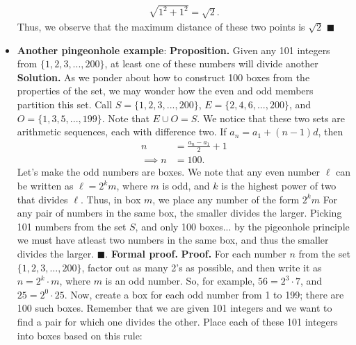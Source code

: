 \documentclass{report}
\begin{document}
\begin{itemize}
            \begin{align*}
                \sqrt{1^{2} + 1^{2}} = \sqrt{2}
            .\end{align*}
            Thus, we observe that the maximum distance of these two points is $\sqrt{2}$ $\blacksquare$
        \item \textbf{Another pingeonhole example}:
            \bigbreak \noindent 
            \textbf{Proposition.} Given any 101 integers from $\{1, 2, 3, . . . , 200\}$, at least one of these numbers will divide another
            \bigbreak \noindent 
            \textbf{Solution.} As we ponder about how to construct 100 boxes from the properties of the set, we may wonder how the even and odd members partition this set. Call $S = \{1,2,3,...,200\} $, $E=\{2,4,6,...,200\} $, and $O = \{1,3,5,...,199\} $. Note that $E \cup O = S$. We notice that these two sets are arithmetic sequences, each with difference two. If $a_{n} = a_{1} +  (n-1)d$, then 
            \begin{align*}
                n &= \frac{a_{n} - a_{1}}{2} + 1 \\
                \implies n&= 100
            .\end{align*}
            \bigbreak \noindent 
            Let's make the odd numbers are boxes. We note that any even number $\ell$ can be written as $\ell = 2^{k}m$, where $m$ is odd, and $k$ is the highest power of two that divides $\ell$. Thus, in box $m$, we place any number of the form $2^{k}m$
            \bigbreak \noindent 
            \bigbreak \noindent 
            For any pair of numbers in the same box, the smaller divides the larger. Picking 101 numbers from the set $S$, and only 100 boxes... by the pigeonhole principle we must have atleast two numbers in the same box, and thus the smaller divides the larger. $\blacksquare$.
            \bigbreak \noindent 
            \textbf{Formal proof.} 
            \textbf{Proof.} For each number $n$ from the set $\{1, 2, 3, \dots, 200\}$, factor out as many 2's as possible, and then write it as $n = 2^k \cdot m$, where $m$ is an odd number. So, for example, $56 = 2^3 \cdot 7$, and $25 = 2^0 \cdot 25$. Now, create a box for each odd number from 1 to 199; there are 100 such boxes.
            \bigbreak \noindent 
            Remember that we are given 101 integers and we want to find a pair for which one divides the other. Place each of these 101 integers into boxes based on this rule:
            \bigbreak \noindent 
            \begin{quote}

\end{quote}
\end{itemize}
\end{document}
